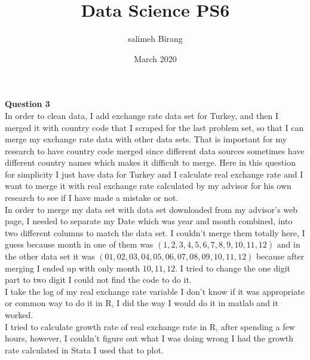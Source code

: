 \documentclass{article}
\title{Data Science PS6}
\author{salimeh Birang }
\date{March 2020}
\begin{document}
\maketitle

\section*{}
\noindent
\textbf{Question 3}\\
In order to clean data, I add exchange rate data set for Turkey, and then I merged it with country code that I scraped for the last problem set, so that I can merge my exchange rate data with other data sets. That is important for my research to have country code merged since different data sources sometimes have different country names which makes it difficult to merge. Here in this question for simplicity I just have data for Turkey and I calculate real exchange rate and I want to merge it with real exchange rate calculated by my advisor for his own research to see if I have made a mistake or not.\\
In order to merge my data set with data set downloaded from my advisor's web page, I needed to separate my Date which was year and month combined, into two different columns to match the data set. I couldn't merge them totally here, I guess because month in one of them was $(1,2,3,4,5,6,7,8,9,10,11,12)$ and in the other data set it was $(01,02,03,04,05,06,07,08,09,10,11,12)$ because after merging I ended up with only month $10,11,12$. I tried to change the one digit part to two digit I could not find the code to do it. \\
I take the log of my real exchange rate variable I don't know if it was appropriate or common way to do it in R, I did the way I would do it in matlab and it worked.\\
I tried to calculate growth rate of real exchange rate in R, after spending a few hours, however, I couldn't figure out what I was doing wrong I had the growth rate calculated in Stata I used that to plot.



\\
\end{document}
